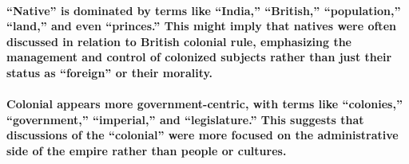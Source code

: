 \documentclass[
]{article}
\begin{document}
\paragraph{``Native'' is dominated by terms like ``India,'' ``British,''
``population,'' ``land,'' and even ``princes.'' This might imply that
natives were often discussed in relation to British colonial rule,
emphasizing the management and control of colonized subjects rather than
just their status as ``foreign'' or their
morality.}\label{native-is-dominated-by-terms-like-india-british-population-land-and-even-princes.-this-might-imply-that-natives-were-often-discussed-in-relation-to-british-colonial-rule-emphasizing-the-management-and-control-of-colonized-subjects-rather-than-just-their-status-as-foreign-or-their-morality.}

\paragraph{Colonial appears more government-centric, with terms like
``colonies,'' ``government,'' ``imperial,'' and ``legislature.'' This
suggests that discussions of the ``colonial'' were more focused on the
administrative side of the empire rather than people or
cultures.}\label{colonial-appears-more-government-centric-with-terms-like-colonies-government-imperial-and-legislature.-this-suggests-that-discussions-of-the-colonial-were-more-focused-on-the-administrative-side-of-the-empire-rather-than-people-or-cultures.}
\end{document}
